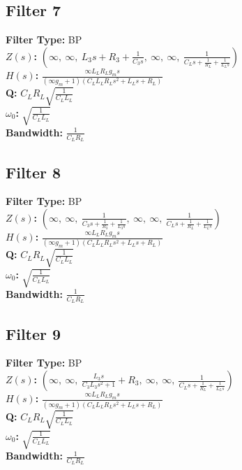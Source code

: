 \documentclass{article}
\begin{document}
\subsection*{Filter 7}
\textbf{Filter Type:} BP \\ 
\textbf{$Z(s)$:} $\left( \infty, \  \infty, \  L_{3} s + R_{3} + \frac{1}{C_{3} s}, \  \infty, \  \infty, \  \frac{1}{C_{L} s + \frac{1}{R_{L}} + \frac{1}{L_{L} s}}\right)$ \\ 
\textbf{$H(s)$:} $\frac{\infty L_{L} R_{L} g_{m} s}{\left(\infty g_{m} + 1\right) \left(C_{L} L_{L} R_{L} s^{2} + L_{L} s + R_{L}\right)}$ \\ 
\textbf{Q:} $C_{L} R_{L} \sqrt{\frac{1}{C_{L} L_{L}}}$ \\ 
\textbf{$\omega_0$:} $\sqrt{\frac{1}{C_{L} L_{L}}}$ \\ 
\textbf{Bandwidth:} $\frac{1}{C_{L} R_{L}}$ \\ 
\subsection*{Filter 8}
\textbf{Filter Type:} BP \\ 
\textbf{$Z(s)$:} $\left( \infty, \  \infty, \  \frac{1}{C_{3} s + \frac{1}{R_{3}} + \frac{1}{L_{3} s}}, \  \infty, \  \infty, \  \frac{1}{C_{L} s + \frac{1}{R_{L}} + \frac{1}{L_{L} s}}\right)$ \\ 
\textbf{$H(s)$:} $\frac{\infty L_{L} R_{L} g_{m} s}{\left(\infty g_{m} + 1\right) \left(C_{L} L_{L} R_{L} s^{2} + L_{L} s + R_{L}\right)}$ \\ 
\textbf{Q:} $C_{L} R_{L} \sqrt{\frac{1}{C_{L} L_{L}}}$ \\ 
\textbf{$\omega_0$:} $\sqrt{\frac{1}{C_{L} L_{L}}}$ \\ 
\textbf{Bandwidth:} $\frac{1}{C_{L} R_{L}}$ \\ 
\subsection*{Filter 9}
\textbf{Filter Type:} BP \\ 
\textbf{$Z(s)$:} $\left( \infty, \  \infty, \  \frac{L_{3} s}{C_{3} L_{3} s^{2} + 1} + R_{3}, \  \infty, \  \infty, \  \frac{1}{C_{L} s + \frac{1}{R_{L}} + \frac{1}{L_{L} s}}\right)$ \\ 
\textbf{$H(s)$:} $\frac{\infty L_{L} R_{L} g_{m} s}{\left(\infty g_{m} + 1\right) \left(C_{L} L_{L} R_{L} s^{2} + L_{L} s + R_{L}\right)}$ \\ 
\textbf{Q:} $C_{L} R_{L} \sqrt{\frac{1}{C_{L} L_{L}}}$ \\ 
\textbf{$\omega_0$:} $\sqrt{\frac{1}{C_{L} L_{L}}}$ \\ 
\textbf{Bandwidth:} $\frac{1}{C_{L} R_{L}}$ \\ 
\end{document}
